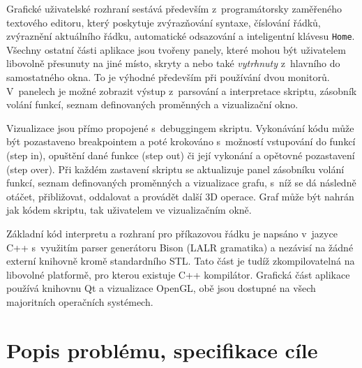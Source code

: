 \documentclass[11pt,twoside,a4paper]{book}
\begin{document}
Grafické uživatelské rozhraní sestává především z~programátorsky zaměřeného textového editoru, který poskytuje zvýrazňování syntaxe, číslování řádků, zvýraznění aktuálního řádku, automatické odsazování a inteligentní klávesu \texttt{Home}. Všechny ostatní části aplikace jsou tvořeny panely, které mohou být uživatelem libovolně přesunuty na jiné místo, skryty a nebo také \textit{vytrhnuty} z~hlavního do samostatného okna. To je výhodné především při používání dvou monitorů. V~panelech je možné zobrazit výstup z~parsování a interpretace skriptu, zásobník volání funkcí, seznam definovaných proměnných a vizualizační okno.

Vizualizace jsou přímo propojené s~debuggingem skriptu. Vykonávání kódu může být pozastaveno breakpointem a poté krokováno s~možností vstupování do funkcí (step in), opuštění dané funkce (step out) či její vykonání a opětovné pozastavení (step over). Při každém zastavení skriptu se aktualizuje panel zásobníku volání funkcí, seznam definovaných proměnných a vizualizace grafu, s~níž se dá následně otáčet, přibližovat, oddalovat a provádět další 3D operace. Graf může být nahrán jak kódem skriptu, tak uživatelem ve vizualizačním okně.

Základní kód interpretu a rozhraní pro příkazovou řádku je napsáno v~jazyce C++ s~využitím parser generátoru Bison (LALR gramatika) a nezávisí na žádné externí knihovně kromě standardního STL. Tato část je tudíž zkompilovatelná na libovolné platformě, pro kterou existuje C++ kompilátor. Grafická část aplikace používá knihovnu Qt a vizualizace OpenGL, obě jsou dostupné na všech majoritních operačních systémech.



\chapter{Popis problému, specifikace cíle}
\label{popis_problemu_specifikace_cile}

\end{document}
